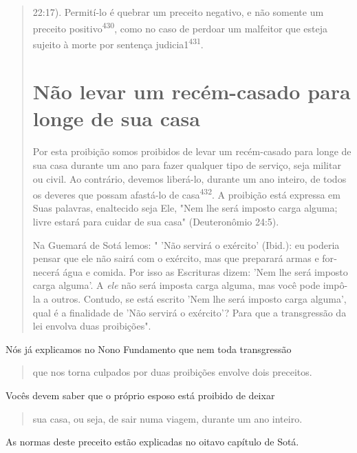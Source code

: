 \begin{quote}

22:17). Permití-lo é quebrar um preceito negativo, e não somente um
preceito positivo\textsuperscript{430}, como no caso de perdoar um
malfeitor que esteja sujeito à morte por sentença
judicia1\textsuperscript{431}.

\section{Não levar um recém-casado para longe de sua casa}

Por esta proibição somos proibidos de levar um recém-casado para longe
de sua casa durante um ano para fazer qualquer tipo de serviço, seja
mili­tar ou civil. Ao contrário, devemos liberá-lo, durante um ano
inteiro, de todos os deveres que possam afastá-lo de
casa\textsuperscript{432}. A proibição está expressa em Suas palavras,
enaltecido seja Ele, "Nem lhe será imposto carga alguma; livre estará
para cuidar de sua casa" (Deuteronômio 24:5).

Na Guemará de Sotá lemos: " 'Não servirá o exército' (Ibid.): eu
po­deria pensar que ele não sairá com o exército, mas que preparará
armas e for­necerá água e comida. Por isso as Escrituras dizem: 'Nem lhe
será imposto car­ga alguma'. A \emph{ele} não será imposta carga alguma,
mas você pode impô-la a ou­tros. Contudo, se está escrito 'Nem lhe será
imposto carga alguma', qual é a finalidade de 'Não servirá o exército'?
Para que a transgressão da lei envolva duas proibições".
\end{quote}

Nós já explicamos no Nono Fundamento que nem toda transgressão

\begin{quote}
que nos torna culpados por duas proibições envolve dois preceitos.
\end{quote}

Vocês devem saber que o próprio esposo está proibido de deixar

\begin{quote}
sua casa, ou seja, de sair numa viagem, durante um ano inteiro.
\end{quote}

As normas deste preceito estão explicadas no oitavo capítulo de Sotá.

